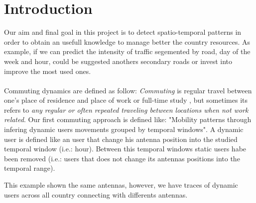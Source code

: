 \newpage
\setcounter{secnumdepth}{1}
\section{Introduction}
Our aim and final goal in this project is to detect spatio-temporal patterns in order to obtain an usefull knowledge to manage better the country resources. As example, if we can predict the intensity of traffic segemented by road, day of the week and hour, could be suggested anothers secondary roads or invest into improve the most used ones.
\\
\\
Commuting dynamics are defined as follow: \emph{Commuting} is regular travel between one's place of residence and place of work or full-time study \citep{wiki:commuting}, but  sometimes its refers to \emph{any regular or often repeated traveling between locations when not work related}. Our first commuting approach is defined like: "Mobility patterns through infering dynamic users movements grouped by temporal windows". A dynamic user is defined like an user that change his antenna position into the studied temporal window (i.e.: hour). Between this temporal windows static users habe been removed (i.e.: users that does not change its antennas positions into the temporal range).


This example shown the same antennas, however, we have traces of dynamic users across all country connecting with differents antennas.
